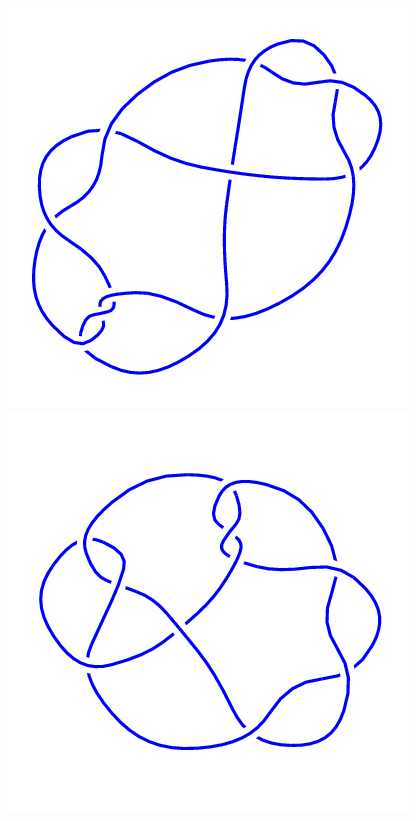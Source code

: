 \begin{figure}[H]
    \begin{minipage}[b]{.18\linewidth}
        \centering
        \includegraphics[width=\linewidth]{../data/10_22.png}
    \end{minipage}
    \begin{minipage}[b]{.18\linewidth}
        \centering
        \includegraphics[width=\linewidth]{../data/10_23.png}

\end{minipage}
\end{figure}
